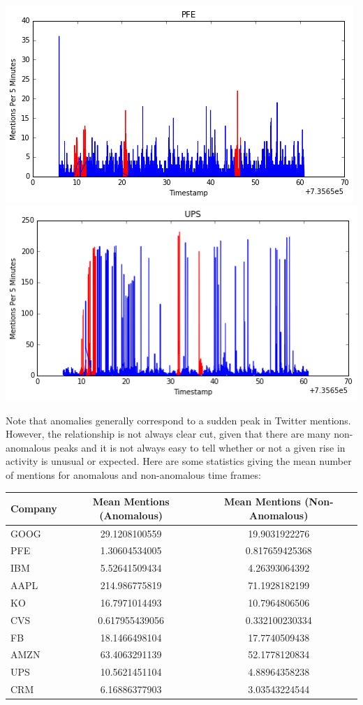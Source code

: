 \documentclass[11pt, margin=1in]{article}
\begin{document}
\begin{center}
\includegraphics[scale=0.4]{img/pfe.png}
\includegraphics[scale=0.4]{img/ups.png}
\end{center}    

Note that anomalies generally correspond to a sudden peak in Twitter mentions.  However, the relationship is not always clear cut, given that there are many non-anomalous peaks and it is not always easy to tell whether or not a given rise in activity is unusual or expected.  Here are some statistics giving the mean number of mentions for anomalous and non-anomalous time frames:
\begin{center}
\begin{tabular}{ l | c c}		
  Company & Mean Mentions (Anomalous) & Mean Mentions (Non-Anomalous) \\
   \hline
GOOG & 29.1208100559 & 19.9031922276 \\
PFE & 1.30604534005 & 0.817659425368 \\
IBM & 5.52641509434 & 4.26393064392 \\
AAPL & 214.986775819 & 71.1928182199 \\
KO & 16.7971014493 & 10.7964806506 \\
CVS & 0.617955439056 & 0.332100230334 \\
FB & 18.1466498104 & 17.7740509438 \\
AMZN & 63.4063291139 & 52.1778120834 \\
UPS & 10.5621451104 & 4.88964358238 \\
CRM & 6.16886377903 & 3.03543224544 \\
\end{tabular}    
\end{center}  
\end{document}
